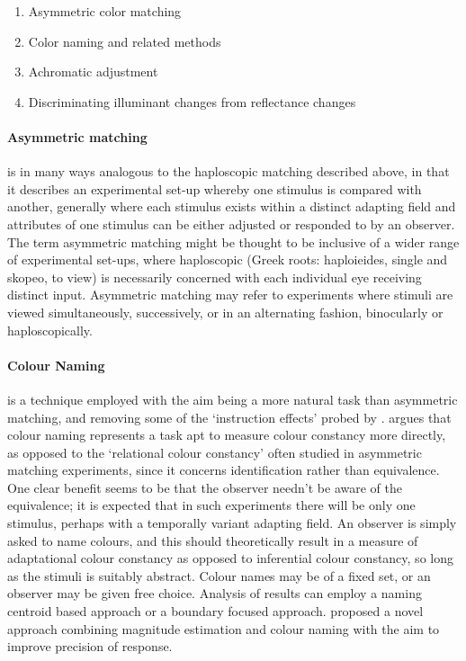 \begin{enumerate}
\item Asymmetric color matching
\item Color naming and related methods
\item Achromatic adjustment
\item Discriminating illuminant changes from reflectance changes
\end{enumerate}

\paragraph{Asymmetric matching} is in many ways analogous to the haploscopic matching described above, in that it describes an experimental set-up whereby one stimulus is compared with another, generally where each stimulus exists within a distinct adapting field and attributes of one stimulus can be either adjusted or responded to by an observer. The term asymmetric matching might be thought to be inclusive of a wider range of experimental set-ups, where haploscopic (Greek roots: haploieides, single and skopeo, to view) is necessarily concerned with each individual eye receiving distinct input. Asymmetric matching may refer to experiments where stimuli are viewed simultaneously, successively, or in an alternating fashion, binocularly or haploscopically.

\paragraph{Colour Naming} is a technique employed with the aim being a more natural task than  asymmetric matching, and removing some of the `instruction effects' probed by \citet{arend_simultaneous_1986}. \citet{foster_color_2011} argues that colour naming represents a task apt to measure colour constancy more directly, as opposed to the `relational colour constancy' often studied in asymmetric matching experiments, since it concerns identification rather than equivalence. One clear benefit seems to be that the observer needn't be aware of the equivalence; it is expected that in such experiments there will be only one stimulus, perhaps with a temporally variant adapting field. An observer is simply asked to name colours, and this should theoretically result in a measure of adaptational colour constancy as opposed to inferential colour constancy, so long as the stimuli is suitably abstract. Colour names may be of a fixed set, or an observer may be given free choice. Analysis of results can employ a naming centroid based approach or a boundary focused approach. \citet{speigle_is_1996} proposed a novel approach combining magnitude estimation and colour naming with the aim to improve precision of response.

